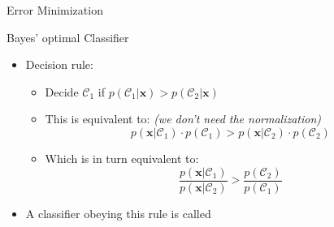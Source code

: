 \begin{frame}{Error Minimization}{}
\end{frame}


\begin{frame}{Bayes' optimal Classifier}{}\important
	\begin{itemize}
		\item Decision rule:
		\begin{itemize}
			\item Decide $\mathcal{C}_1$ if $p(\mathcal{C}_1 \vert \bm{x}) > p(\mathcal{C}_2 \vert \bm{x})$
			\item This is equivalent to: \textit{(we don't need the normalization)}
			\begin{equation}
				p(\bm{x} \vert \mathcal{C}_1) \cdot p(\mathcal{C}_1) >
					p(\bm{x} \vert \mathcal{C}_2) \cdot p(\mathcal{C}_2)
			\end{equation} 
			\item Which is in turn equivalent to:
			\begin{equation}
				\frac{p(\bm{x} \vert \mathcal{C}_1)}{p(\bm{x} \vert \mathcal{C}_2)} >
					\frac{p(\mathcal{C}_2)}{p(\mathcal{C}_1)}
			\end{equation}
		\end{itemize}
		\item A classifier obeying this rule is called 
	\end{itemize}
\end{frame}


